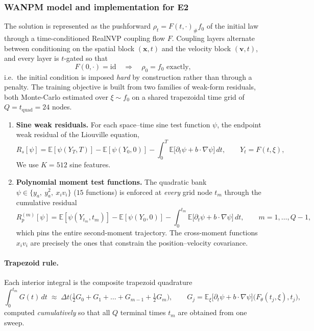 \documentclass[11pt]{article}
\newcommand{\E}{\mathbb{E}}
\newcommand{\grad}{\nabla}
\newcommand{\vx}{\mathbf{x}}
\newcommand{\vv}{\mathbf{v}}
\theoremstyle{plain}
\begin{document}
\subsubsection{WANPM model and implementation for E2}
\label{subsec:e2_model}




The solution is represented as the pushforward $\rho_t = F(t,\cdot)_{\#} f_0$ of the initial law through a time-conditioned RealNVP coupling flow $F$. Coupling layers alternate between conditioning on the spatial block $(\vx,t)$ and the velocity block $(\vv,t)$, and every layer is $t$-gated so that
\begin{equation}
F(0,\cdot)=\mathrm{id}\quad\Longrightarrow\quad \rho_0=f_0 \text{ exactly,}
\end{equation}
i.e.\ the initial condition is imposed \emph{hard} by construction rather than
through a penalty. The training objective is built from two families of weak-form
residuals, both Monte-Carlo estimated over $\xi\sim f_0$ on a shared trapezoidal
time grid of $Q=t_{\mathrm{quad}}=24$ nodes.
\begin{enumerate}
\item[\textbf{(i)}] \textbf{Sine weak residuals.} For each space--time sine test
function $\psi$, the endpoint weak residual of the Liouville equation,
\begin{equation}
R_s[\psi]=\E[\psi(Y_T,T)]-\E[\psi(Y_0,0)]
-\int_0^T \E\bigl[\partial_t\psi + b\cdot\grad\psi\bigr]\,dt,
\qquad Y_t=F(t,\xi),
\label{eq:e2_weak}
\end{equation}
 We use $K=512$ sine features.
 
\item[\textbf{(ii)}] \textbf{Polynomial moment test functions.} The quadratic bank $\psi\in\{y_a,\ y_a^2,\ x_i v_i\}$ ($15$ functions) is enforced at \emph{every} grid node $t_m$ through the cumulative residual
\begin{equation}
R_p^{(m)}[\psi]=\E[\psi(Y_{t_m},t_m)]-\E[\psi(Y_0,0)]
-\int_0^{t_m}\E\bigl[\partial_t\psi + b\cdot\grad\psi\bigr]\,dt,
\qquad m=1,\dots,Q-1,
\label{eq:e2_moment}
\end{equation}
which pins the entire second-moment trajectory. The cross-moment functions $x_i v_i$ are precisely the ones that constrain the position--velocity covariance.
\end{enumerate}


\paragraph{Trapezoid rule.} Each interior integral is the composite trapezoid quadrature
\begin{equation}
\int_0^{t_m} G(t)\,dt \;\approx\; \Delta t\Big(\tfrac12 G_0 + G_1 + \dots + G_{m-1} + \tfrac12 G_m\Big),\qquad
G_j=\E_\xi\big[\partial_t\psi+b\cdot\grad\psi\big]\big(F_\theta(t_j,\xi),t_j\big),
\end{equation}
computed \emph{cumulatively} so that all $Q$ terminal times $t_m$ are obtained from one sweep. 
\end{document}
